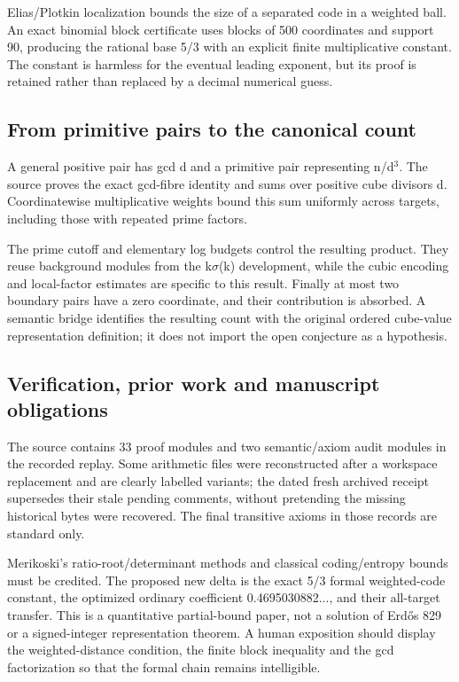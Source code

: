 \documentclass[11pt,a4paper]{article}
\begin{document}
Elias/Plotkin localization bounds the size of a separated code in a weighted ball. An exact binomial block certificate uses blocks of 500 coordinates and support 90, producing the rational base 5/3 with an explicit finite multiplicative constant. The constant is harmless for the eventual leading exponent, but its proof is retained rather than replaced by a decimal numerical guess.

\subsection{From primitive pairs to the canonical count}
A general positive pair has gcd d and a primitive pair representing n/d\ensuremath{^3}. The source proves the exact gcd-fibre identity and sums over positive cube divisors d. Coordinatewise multiplicative weights bound this sum uniformly across targets, including those with repeated prime factors.

The prime cutoff and elementary log budgets control the resulting product. They reuse background modules from the k\ensuremath{\sigma}(k) development, while the cubic encoding and local-factor estimates are specific to this result. Finally at most two boundary pairs have a zero coordinate, and their contribution is absorbed. A semantic bridge identifies the resulting count with the original ordered cube-value representation definition; it does not import the open conjecture as a hypothesis.

\subsection{Verification, prior work and manuscript obligations}
The source contains 33 proof modules and two semantic/axiom audit modules in the recorded replay. Some arithmetic files were reconstructed after a workspace replacement and are clearly labelled variants; the dated fresh archived receipt supersedes their stale pending comments, without pretending the missing historical bytes were recovered. The final transitive axioms in those records are standard only.

Merikoski's ratio-root/determinant methods and classical coding/entropy bounds must be credited. The proposed new delta is the exact 5/3 formal weighted-code constant, the optimized ordinary coefficient 0.4695030882..., and their all-target transfer. This is a quantitative partial-bound paper, not a solution of Erdős 829 or a signed-integer representation theorem. A human exposition should display the weighted-distance condition, the finite block inequality and the gcd factorization so that the formal chain remains intelligible.
\end{document}
